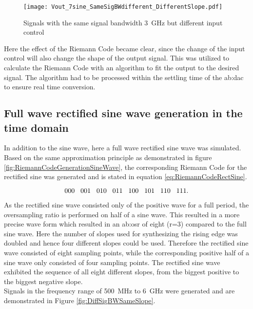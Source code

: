\begin{figure}[htb!]
	\centering
  \texttt{[image: Vout\_7sine\_SameSigBWdifferent\_DifferentSlope.pdf]}
	\caption{Signals with the same signal bandwidth \SI{3}{\giga \hertz} but different input control}
	\label{fig:SameSigBWDifSlope}
\end{figure}

Here the effect of the Riemann Code became clear, since the change of the input control will also change the shape of the output signal.
This was utilized to calculate the Riemann Code with an algorithm to fit the output to the desired signal.
The algorithm had to be processed within the settling time of the \gls{ab:dac} to ensure real time conversion.

\subsection{Full wave rectified sine wave generation in the time domain}
In addition to the sine wave, here a full wave rectified sine wave was simulated.
Based on the same approximation principle as demonstrated in figure \ref{fig:RiemannCodeGenerationSineWave}, the corresponding Riemann Code for the rectified sine was generated and is stated in equation \ref{eq:RiemannCodeRectSine}.

\begin{equation}
 000\hspace{.3cm} 001\hspace{.3cm} 010\hspace{.3cm} 011\hspace{.3cm} 100\hspace{.3cm} 101\hspace{.3cm} 110\hspace{.3cm} 111.
\label{eq:RiemannCodeRectSine}
\end{equation}

As the rectified sine wave consisted only of the positive wave for a full period, the oversampling ratio is performed on half of a sine wave.
This resulted in a more precise wave form which resulted in an \gls{ab:osr} of eight (r=3) compared to the full sine wave.
Here the number of slopes used for synthesizing the rising edge was doubled and hence four different slopes could be used.
Therefore the rectified sine wave consisted of eight sampling points, while the corresponding positive half of a sine wave only consisted of four sampling points.
The rectified sine wave exhibited the sequence of all eight different slopes, from the biggest positive to the biggest negative slope.\\
Signals in the frequency range of \SI{500}{\mega \hertz} to \SI{6}{\giga \hertz} were generated and  are demonstrated in Figure \ref{fig:DiffSigBWSameSlope}.

